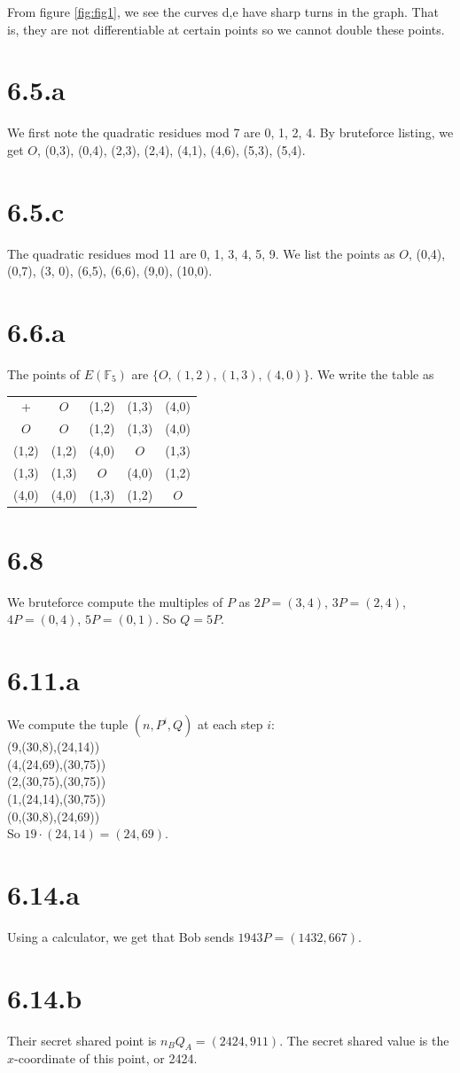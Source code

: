 \documentclass{article}
\begin{document}
From figure \ref{fig:fig1}, we see the curves d,e have sharp turns in the graph. That is, they are not differentiable at certain points so we cannot double these  points.

\section*{6.5.a}
We first note the quadratic residues mod 7 are 0, 1, 2, 4. By bruteforce listing, we get $O$, (0,3), (0,4), (2,3), (2,4), (4,1), (4,6), (5,3), (5,4).

\section*{6.5.c}
The quadratic residues mod 11 are 0, 1, 3, 4, 5, 9. We list the points as $O$, (0,4), (0,7), (3, 0), (6,5), (6,6), (9,0), (10,0).

\section*{6.6.a}
The points of $E(\mathbb{F}_5)$ are $\{O, (1,2), (1,3), (4,0)\}$. We write the table as

\begin{tabular}{|c||c|c|c|c|}
\hline
+ & $O$ & (1,2) & (1,3) & (4,0)\\
\hhline{|=#=|=|=|=|}
$O$ & $O$ & (1,2) & (1,3) & (4,0)\\
\hline
(1,2) & (1,2) & (4,0) & $O$ & (1,3)\\
\hline
(1,3) & (1,3) & $O$ & (4,0) & (1,2)\\
\hline
(4,0) & (4,0) & (1,3) & (1,2) & $O$\\
\hline
\end{tabular}

\section*{6.8}
We bruteforce compute the multiples of $P$ as $2P = (3,4)$, $3P = (2,4)$, $4P = (0,4)$, $5P = (0,1)$. So $Q = 5P$.

\section*{6.11.a}
We compute the tuple $(n,P^i, Q)$ at each step $i$:\\
(9,(30,8),(24,14))\\
(4,(24,69),(30,75))\\
(2,(30,75),(30,75))\\
(1,(24,14),(30,75))\\
(0,(30,8),(24,69))\\
So $19 \cdot (24,14) = (24,69)$.

\section*{6.14.a}
Using a calculator, we get that Bob sends $1943P = (1432,667)$.

\section*{6.14.b}
Their secret shared point is $n_BQ_A = (2424,911)$. The secret shared value is the $x$-coordinate of this point, or 2424.
\end{document}
